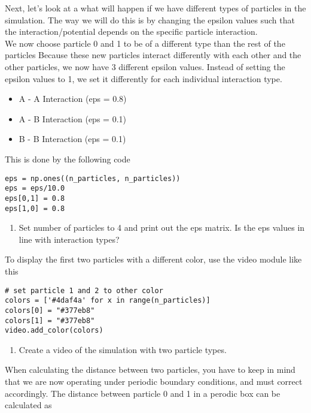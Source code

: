 \documentclass{article}
\begin{document}
Next, let's look at a what will happen if we have different types of particles in the simulation.
The way we will do this is by changing the epsilon values such that the interaction/potential depends on the specific particle interaction.\\

We now choose particle 0 and 1 to be of a different type than the rest of the particles
Because these new particles interact differently with each other and the other particles, we now have 3 different epsilon values.
Instead of setting the epsilon values to 1, we set it differently for each individual interaction type.

\begin{itemize}
    \item A - A Interaction (eps = 0.8)
    \item A - B Interaction (eps = 0.1)
    \item B - B Interaction (eps = 0.1)
\end{itemize}

This is done by the following code

\begin{lstlisting}
eps = np.ones((n_particles, n_particles))
eps = eps/10.0
eps[0,1] = 0.8
eps[1,0] = 0.8
\end{lstlisting}

\begin{enumerate}[resume]
    \item Set number of particles to 4 and print out the eps matrix.
        Is the eps values in line with interaction types?
\end{enumerate}

To display the first two particles with a different color, use the video module like this
\begin{lstlisting}
# set particle 1 and 2 to other color
colors = ['#4daf4a' for x in range(n_particles)]
colors[0] = "#377eb8"
colors[1] = "#377eb8"
video.add_color(colors)
\end{lstlisting}


\begin{enumerate}[resume]
    \item Create a video of the simulation with two particle types.
\end{enumerate}

When calculating the distance between two particles, you have to keep in mind that we are now operating under periodic boundary conditions, and must correct accordingly.
The distance between particle 0 and 1 in a perodic box can be calculated as
\end{document}
